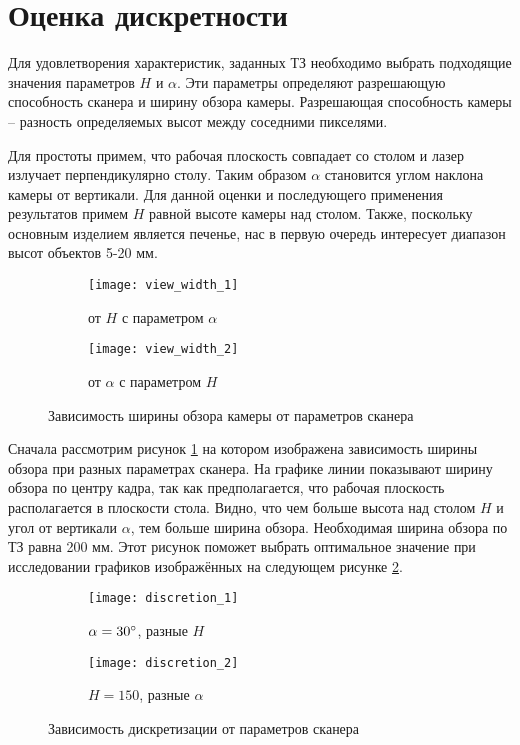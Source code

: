     \section{Оценка дискретности}\label{sec:error}
        Для удовлетворения характеристик, заданных ТЗ необходимо выбрать подходящие значения параметров $ H $ и $\alpha$. Эти параметры определяют разрешающую способность сканера и ширину обзора камеры. Разрешающая способность камеры -- разность определяемых высот между соседними пикселями.
        
        Для простоты примем, что рабочая плоскость совпадает со столом и лазер излучает перпендикулярно столу. Таким образом $\alpha$ становится углом наклона камеры от вертикали. Для данной оценки и последующего применения результатов примем $ H $ равной высоте камеры над столом. Также, поскольку основным изделием является печенье, нас в первую очередь интересует диапазон высот объектов 5-20 мм.
        \begin{figure}[H]
            \centering
            \begin{subfigure}{\linewidth}
                \centering
                \texttt{[image: view\_width\_1]}
                \caption{от $ H $ с параметром $ \alpha $}
            \end{subfigure}
            \begin{subfigure}{\linewidth}
                \centering
                \texttt{[image: view\_width\_2]}
                \caption{от $ \alpha $ с параметром $ H $}
            \end{subfigure}
            \caption{Зависимость ширины обзора камеры от параметров сканера}
            \label{pic:view_width}
        \end{figure}
        Сначала рассмотрим рисунок \ref{pic:view_width} на котором изображена зависимость ширины обзора при разных параметрах сканера. На графике линии показывают ширину обзора по центру кадра, так как предполагается, что рабочая плоскость располагается в плоскости стола. Видно, что чем больше высота над столом $ H $ и угол от вертикали $ \alpha $, тем больше ширина обзора. Необходимая ширина обзора по ТЗ равна 200 мм. Этот рисунок поможет выбрать оптимальное значение при исследовании графиков изображённых на следующем рисунке \ref{pic:discretion}.
        \begin{figure}[H]
            \centering
            \begin{subfigure}{\linewidth}
                \centering
                \texttt{[image: discretion\_1]}
                \caption{$ \alpha = 30^{\circ} $, разные $ H $}
            \end{subfigure}
            \begin{subfigure}{\linewidth}
                \centering
                \texttt{[image: discretion\_2]}
                \caption{$ H = 150 $, разные $ \alpha $}
            \end{subfigure}
            \caption{Зависимость дискретизации от параметров сканера}
            \label{pic:discretion}
        \end{figure}
